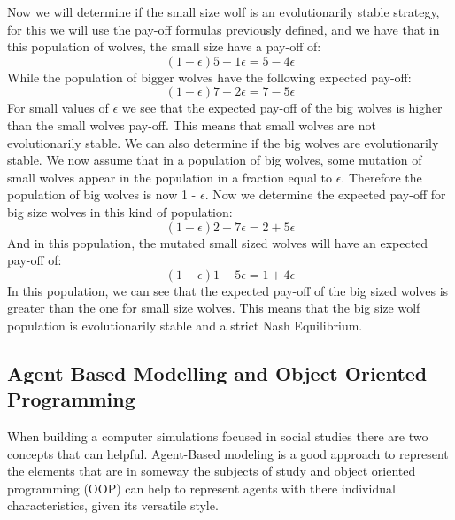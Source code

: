 \documentclass{book}
\begin{document}
Now we will determine if the small size wolf is an evolutionarily stable strategy, for this we will use the pay-off formulas previously defined, and we have that in this population of wolves, the small size have a pay-off of:
\begin{equation}
(1-{\epsilon})5 + 1{\epsilon} = 5 - 4{\epsilon}
\end{equation}
While the population of bigger wolves have the following expected pay-off:
\begin{equation}
(1-{\epsilon})7 + 2{\epsilon} = 7 - 5{\epsilon}
\end{equation}
For small values of $\epsilon$ we see that the expected pay-off of the big wolves is higher than the small wolves pay-off.  This means that small wolves are not evolutionarily stable.
We can also determine if the big wolves are evolutionarily stable. We now assume that in a population of big wolves, some mutation of small wolves appear in the population in a fraction equal to $\epsilon$. Therefore the population of big wolves is now 1 - $\epsilon$. Now we determine the expected pay-off for big size wolves in this kind of population:
 \begin{equation}
(1-{\epsilon})2 + 7{\epsilon} = 2 + 5{\epsilon}
\end{equation}
And in this population, the mutated small sized wolves will have an expected pay-off of:
\begin{equation}
(1-{\epsilon})1 + 5{\epsilon} = 1 + 4{\epsilon}
\end{equation}
In this population, we can see that the expected pay-off of the big sized wolves is greater than the one for small size wolves. This means that the big size wolf population is evolutionarily stable and a strict Nash Equilibrium.

\subsection{Agent Based Modelling and Object Oriented Programming} \label{ABM}
When building a computer simulations focused in social studies there are two concepts that can helpful. Agent-Based modeling is a good approach to represent the elements that are in someway the subjects of study and object oriented programming (OOP) can help to represent agents with there individual characteristics, given its versatile style.
\end{document}
